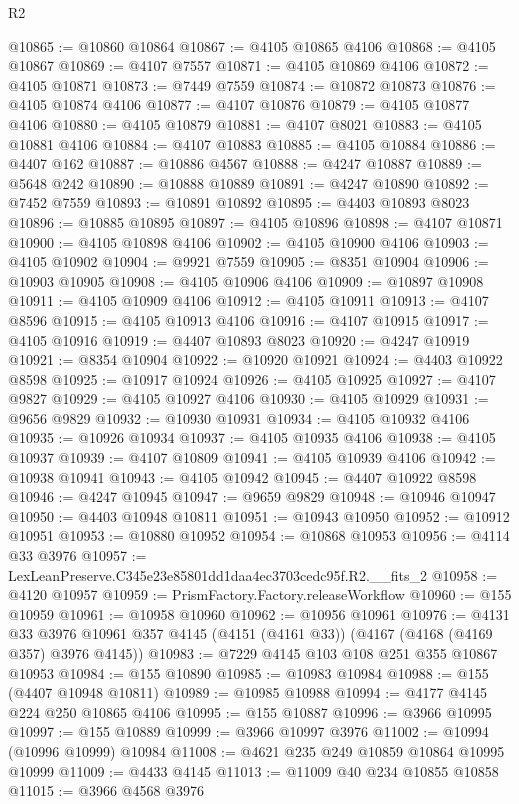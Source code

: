 \begin{lexlean}{R2}
\begin{coremodule}
@10865 := @10860 @10864
@10867 := @4105 @10865 @4106
@10868 := @4105 @10867
@10869 := @4107 @7557
@10871 := @4105 @10869 @4106
@10872 := @4105 @10871
@10873 := @7449 @7559
@10874 := @10872 @10873
@10876 := @4105 @10874 @4106
@10877 := @4107 @10876
@10879 := @4105 @10877 @4106
@10880 := @4105 @10879
@10881 := @4107 @8021
@10883 := @4105 @10881 @4106
@10884 := @4107 @10883
@10885 := @4105 @10884
@10886 := @4407 @162
@10887 := @10886 @4567
@10888 := @4247 @10887
@10889 := @5648 @242
@10890 := @10888 @10889
@10891 := @4247 @10890
@10892 := @7452 @7559
@10893 := @10891 @10892
@10895 := @4403 @10893 @8023
@10896 := @10885 @10895
@10897 := @4105 @10896
@10898 := @4107 @10871
@10900 := @4105 @10898 @4106
@10902 := @4105 @10900 @4106
@10903 := @4105 @10902
@10904 := @9921 @7559
@10905 := @8351 @10904
@10906 := @10903 @10905
@10908 := @4105 @10906 @4106
@10909 := @10897 @10908
@10911 := @4105 @10909 @4106
@10912 := @4105 @10911
@10913 := @4107 @8596
@10915 := @4105 @10913 @4106
@10916 := @4107 @10915
@10917 := @4105 @10916
@10919 := @4407 @10893 @8023
@10920 := @4247 @10919
@10921 := @8354 @10904
@10922 := @10920 @10921
@10924 := @4403 @10922 @8598
@10925 := @10917 @10924
@10926 := @4105 @10925
@10927 := @4107 @9827
@10929 := @4105 @10927 @4106
@10930 := @4105 @10929
@10931 := @9656 @9829
@10932 := @10930 @10931
@10934 := @4105 @10932 @4106
@10935 := @10926 @10934
@10937 := @4105 @10935 @4106
@10938 := @4105 @10937
@10939 := @4107 @10809
@10941 := @4105 @10939 @4106
@10942 := @10938 @10941
@10943 := @4105 @10942
@10945 := @4407 @10922 @8598
@10946 := @4247 @10945
@10947 := @9659 @9829
@10948 := @10946 @10947
@10950 := @4403 @10948 @10811
@10951 := @10943 @10950
@10952 := @10912 @10951
@10953 := @10880 @10952
@10954 := @10868 @10953
@10956 := @4114 @33 @3976
@10957 := LexLeanPreserve.C345e23e85801dd1daa4ec3703cedc95f.R2.__fits_2
@10958 := @4120 @10957
@10959 := PrismFactory.Factory.releaseWorkflow
@10960 := @155 @10959
@10961 := @10958 @10960
@10962 := @10956 @10961
@10976 := @4131
    @33
    @3976
    @10961
    @357
    @4145
    (@4151 (@4161 @33))
    (@4167 (@4168 (@4169 @357) @3976 @4145))
@10983 := @7229 @4145 @103 @108 @251 @355 @10867 @10953
@10984 := @155 @10890
@10985 := @10983 @10984
@10988 := @155 (@4407 @10948 @10811)
@10989 := @10985 @10988
@10994 := @4177 @4145 @224 @250 @10865 @4106
@10995 := @155 @10887
@10996 := @3966 @10995
@10997 := @155 @10889
@10999 := @3966 @10997 @3976
@11002 := @10994 (@10996 @10999) @10984
@11008 := @4621 @235 @249 @10859 @10864 @10995 @10999
@11009 := @4433 @4145
@11013 := @11009 @40 @234 @10855 @10858
@11015 := @3966 @4568 @3976

\end{coremodule}
\end{lexlean}
